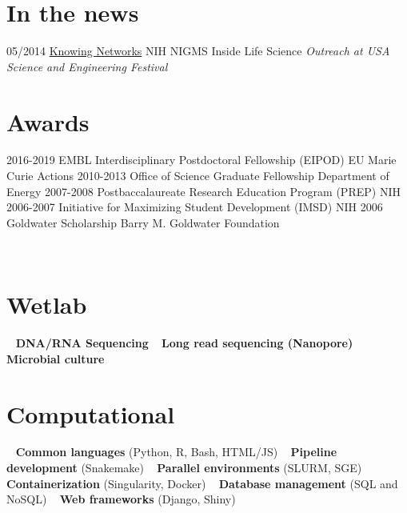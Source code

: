 \documentclass[usenames,dvipsnames]{friggeri-cv}
\begin{document}
\section{In the news}
\begin{entrylist}
  \entry
    {05/2014}
    {\href{http://publications.nigms.nih.gov/insidelifescience/knowing-networks.html}{Knowing Networks}}
    {NIH NIGMS Inside Life Science}
    {\emph{Outreach at USA Science and Engineering Festival}}
\end{entrylist}

\section{Awards}
\begin{entrylist}
   \entry
    {2016-2019}
    {EMBL Interdisciplinary Postdoctoral Fellowship (EIPOD)}
    {EU Marie Curie Actions}
    {}
  \entry
    {2010-2013}
    {Office of Science Graduate Fellowship}
    {Department of Energy}
    {}
     \entry
    {2007-2008}
    {Postbaccalaureate Research Education Program (PREP)}
    {NIH}
    {}
     \entry
    {2006-2007}
    {Initiative for Maximizing Student Development (IMSD)}
    {NIH}
    {}
   \entry
    {2006}
    {Goldwater Scholarship}
    {Barry M. Goldwater Foundation}
    {}
\end{entrylist}

\begin{aside}
 ~
 ~
 ~
\section{Wetlab}
    ~
    \textbf{DNA/RNA Sequencing}
    ~
    \textbf{Long read sequencing (Nanopore)}
    ~
    \textbf{Microbial culture}
    ~
  \section{Computational}
   ~
    \textbf{Common languages}
    (Python, R, Bash, HTML/JS)
    ~
    \textbf{Pipeline development}
    (Snakemake)
    ~
    \textbf{Parallel environments}
     (SLURM, SGE)
    ~
    \textbf{Containerization}
    (Singularity, Docker)
    ~
    \textbf{Database management}
     (SQL and NoSQL)
    ~
    \textbf{Web frameworks }
    (Django, Shiny)
    ~
    ~
\end{aside}
\end{document}
